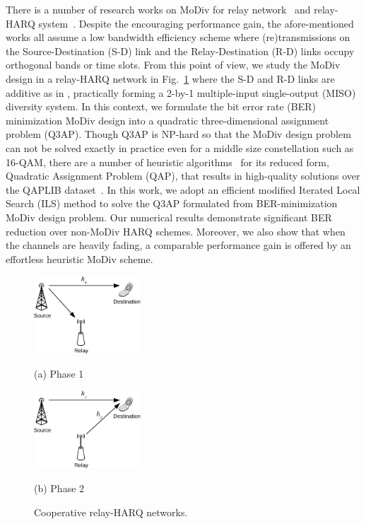 \documentclass[journal]{IEEEtran}
\begin{document}
There is a number of research works on MoDiv for relay
network~\cite{seddik2008trans, khormuji2008rate} and relay-HARQ
system~\cite{kim2009design, ryu2011ber}. Despite the encouraging
performance gain, the afore-mentioned works all assume a low bandwidth
efficiency scheme where (re)transmissions on the Source-Destination (S-D) link
and the Relay-Destination (R-D) links occupy orthogonal bands or time slots.
From this point of view, we study the MoDiv design in a relay-HARQ network in
Fig.~\ref{fig:system_model} where the S-D and R-D links are additive as in
\cite{cover1979capacity, nabar2004fading}, practically
forming a 2-by-1 multiple-input single-output (MISO) diversity system. In this
context, we formulate the bit error rate (BER) minimization MoDiv design into a
quadratic three-dimensional assignment problem (Q3AP). Though Q3AP is NP-hard so
that the MoDiv design problem can not be solved exactly in practice even for a
middle size constellation such as 16-QAM, there are a number of heuristic
algorithms~\cite{benlic2015memetic}
for its reduced form, Quadratic Assignment Problem (QAP), that results in
high-quality solutions over the QAPLIB dataset~\cite{burkard1997qaplib}. In this
work, we adopt an efficient modified Iterated Local Search (ILS) method to solve
the Q3AP formulated from BER-minimization MoDiv design problem. Our numerical
results demonstrate significant BER reduction over non-MoDiv HARQ schemes.
Moreover, we also show that when the channels are heavily fading, a comparable
performance gain is offered by an effortless heuristic MoDiv scheme.

\begin{figure}[!t]
    \begin{minipage}[b]{0.48\linewidth}
      \centering
      \centerline{\includegraphics[width=4.0cm]{./figs/relayHARQ1.eps}}
      \centerline{(a) Phase 1}\medskip
    \end{minipage}
    \hfill
    \begin{minipage}[b]{.48\linewidth}
      \centering
      \centerline{\includegraphics[width=4.0cm]{./figs/relayHARQ2.eps}}
      \centerline{(b) Phase 2}\medskip
    \end{minipage}
    \caption{Cooperative relay-HARQ networks.}
    \label{fig:system_model}
\end{figure}
\end{document}
